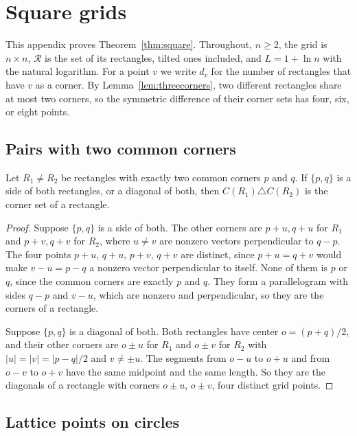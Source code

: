 \section{Square grids}\label{app:square}

This appendix proves Theorem~\ref{thm:square}. Throughout, $n\ge2$, the grid is $n\times n$, $\mathcal R$ is the set of its rectangles, tilted ones included, and $L=1+\ln n$ with the natural logarithm. For a point $v$ we write $d_v$ for the number of rectangles that have $v$ as a corner. By Lemma~\ref{lem:threecorners}, two different rectangles share at most two corners, so the symmetric difference of their corner sets has four, six, or eight points.

\subsection{Pairs with two common corners}

\begin{lemma}\label{lem:compress}
Let $R_1\ne R_2$ be rectangles with exactly two common corners $p$ and $q$. If $\{p,q\}$ is a side of both rectangles, or a diagonal of both, then $C(R_1)\triangle C(R_2)$ is the corner set of a rectangle.
\end{lemma}

\begin{proof}
Suppose $\{p,q\}$ is a side of both. The other corners are $p+u,q+u$ for $R_1$ and $p+v,q+v$ for $R_2$, where $u\ne v$ are nonzero vectors perpendicular to $q-p$. The four points $p+u$, $q+u$, $p+v$, $q+v$ are distinct, since $p+u=q+v$ would make $v-u=p-q$ a nonzero vector perpendicular to itself. None of them is $p$ or $q$, since the common corners are exactly $p$ and $q$. They form a parallelogram with sides $q-p$ and $v-u$, which are nonzero and perpendicular, so they are the corners of a rectangle.

Suppose $\{p,q\}$ is a diagonal of both. Both rectangles have center $o=(p+q)/2$, and their other corners are $o\pm u$ for $R_1$ and $o\pm v$ for $R_2$ with $|u|=|v|=|p-q|/2$ and $v\ne\pm u$. The segments from $o-u$ to $o+u$ and from $o-v$ to $o+v$ have the same midpoint and the same length. So they are the diagonals of a rectangle with corners $o\pm u$, $o\pm v$, four distinct grid points.
\end{proof}

\subsection{Lattice points on circles}

